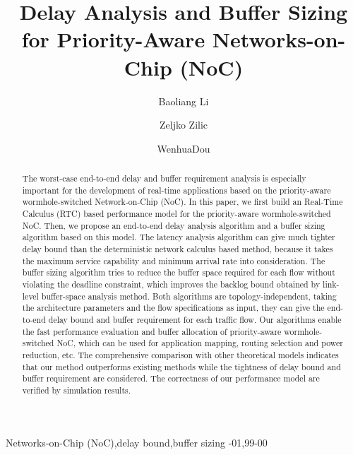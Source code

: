 \documentclass[preprint]{elsarticle}
\begin{document}
\begin{frontmatter}

\title{Delay Analysis and Buffer Sizing for Priority-Aware Networks-on-Chip (NoC)}

\author[nudt]{Baoliang Li}
\author[mcgill]{Zeljko Zilic}
\author[nudt]{WenhuaDou}
\address[nudt]{College of Computer Science, National University of Defense Technology, Changsha 410073, P.R. China}
\address[mcgill]{Department of Electrical \& Computer Engineering, McGill University, Montreal H3A-2A7, Quebec, Canada}

\begin{abstract}
The worst-case end-to-end delay and buffer requirement analysis is especially important for the development of real-time applications based on the priority-aware wormhole-switched Network-on-Chip (NoC). In this paper, we first build an Real-Time Calculus (RTC) based performance model for the priority-aware wormhole-switched NoC. Then, we propose an end-to-end delay analysis algorithm and a buffer sizing algorithm based on this model. The latency analysis algorithm can give much tighter delay bound than the deterministic network calculus based method, because it takes the maximum service capability and minimum arrival rate into consideration. The buffer sizing algorithm tries to reduce the buffer space required for each flow without violating the deadline constraint, which improves the backlog bound obtained by link-level buffer-space analysis method. Both algorithms are topology-independent, taking the architecture parameters and the flow specifications as input, they can give the end-to-end delay bound and buffer requirement for each traffic flow. Our algorithms enable the fast performance evaluation and buffer allocation of priority-aware wormhole-switched NoC, which can be used for application mapping, routing selection and power reduction, etc. The comprehensive comparison with other theoretical models indicates that our method outperforms existing methods while the tightness of delay bound and buffer requirement are considered. The correctness of our performance model are verified by simulation results.
\end{abstract}

\begin{keyword}
Networks-on-Chip (NoC)\sep delay bound\sep buffer sizing
-01\sep  99-00
\end{keyword}

\end{frontmatter}
\end{document}
